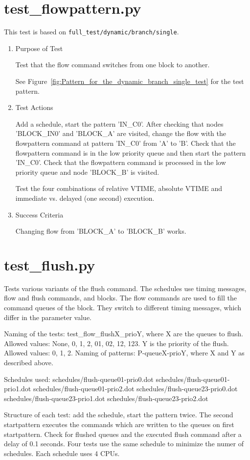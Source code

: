 \documentclass[12pt,a4paper]{report}
\begin{document}
\section{test\_flowpattern.py}
This test is based on \texttt{full\_test/dynamic/branch/single}.
\begin{enumerate}
	\item Purpose of Test

	Test that the flow command switches from one block to another.

	See Figure~\ref{fig:Pattern_for_the_dynamic_branch_single_test} for the test pattern.
	\item Test Actions

	Add a schedule, start the pattern 'IN\_C0'. After checking that nodes 'BLOCK\_IN0' and 'BLOCK\_A' are visited,
        change the flow with the flowpattern command at pattern 'IN\_C0' from 'A' to 'B'. Check that the flowpattern
        command is in the low priority queue and then start the pattern 'IN\_C0'. Check that the flowpattern
        command is processed in the low priority queue and node 'BLOCK\_B' is visited.

  Test the four combinations of relative VTIME, absolute VTIME and immediate vs. delayed (one second) execution.
	\item Success Criteria

	Changing flow from 'BLOCK\_A' to 'BLOCK\_B' works.
\end{enumerate}

\section{test\_flush.py}
Tests various variants of the flush command. The schedules use timing messages, flow and flush commands, and blocks.
The flow commands are used to fill the command queues of the block. They switch to different timing messages, which
differ in the parameter value.

Naming of the tests:
test\_flow\_flushX\_prioY, where
X are the queues to flush. Allowed values: None, 0, 1, 2, 01, 02, 12, 123.
Y is the priority of the flush. Allowed values: 0, 1, 2.
Naming of patterns:
P-queueX-prioY, where X and Y as described above.

Schedules used:
schedules/flush-queue01-prio0.dot
schedules/flush-queue01-prio1.dot
schedules/flush-queue01-prio2.dot
schedules/flush-queue23-prio0.dot
schedules/flush-queue23-prio1.dot
schedules/flush-queue23-prio2.dot

Structure of each test:
add the schedule, start the pattern twice. The second startpattern executes the commands which are written
to the queues on first startpattern.
Check for flushed queues and the executed flush command after a delay of 0.1 seconds.
Four tests use the same schedule to minimize the numer of schedules. Each schedule uses 4 CPUs.
\end{document}
